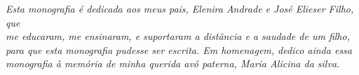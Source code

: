 \begin{dedicatoria}
   \vspace*{\fill}
   \centering
   \noindent

   \textit{Esta monografia é dedicada aos meus pais, Elenira Andrade e José Elieser Filho, que\\
   me educaram, me ensinaram, e suportaram a distância e a saudade de um filho, para que esta monografia pudesse ser escrita. Em homenagem, dedico ainda essa monografia à memória de minha querida avó paterna, Maria Alicina da silva.} \vspace*{\fill}
\end{dedicatoria}
